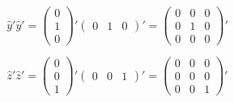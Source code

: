 \documentclass[double,12pt]{beavtex}
\begin{document}
\begin{displaymath}{\hat{y}'\hat{y}'= \left(\begin{array}{c} 0 \\ 1 \\ 0 \end{array}\right)'\left(\begin{array}{ccc} 0 & 1 & 0 \end{array}\right)'=\left(\begin{array}{ccc} 0 & 0 & 0 \\ 0 & 1 & 0 \\ 0 & 0 & 0 \end{array}\right)'}\end{displaymath}

\begin{displaymath}{\hat{z}'\hat{z}'= \left(\begin{array}{c} 0 \\ 0 \\ 1 \end{array}\right)'\left(\begin{array}{ccc} 0 & 0 & 1 \end{array}\right)'=\left(\begin{array}{ccc} 0 & 0 & 0 \\ 0 & 0 & 0 \\ 0 & 0 & 1 \end{array}\right)'}\end{displaymath}
\end{document}
